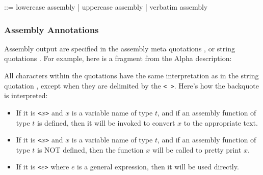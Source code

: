 \begin{SML}
    ::=
      lowercase assembly
    | uppercase assembly
    | verbatim  assembly
\end{SML}

\subsubsection{Assembly Annotations}

   Assembly output are specified in the assembly meta quotations
, or string quotations .   
For example, here is a fragment from the Alpha description:


   All characters within the quotations  have the same 
interpretation as in the string quotation , except when
they are delimited by the 
\verb|< >|.
Here's how the backquote is interpreted:
\begin{itemize}
\item If it is \verb|<|$x$\verb.>. and $x$ is a variable name of type $t$,
  and if an assembly function of type $t$ is defined, then it will be invoked
  to convert $x$ to the appropriate text.
\item If it is \verb|<|$x$\verb.>. and $x$ is a variable name of type $t$,
  and if an assembly function of type $t$ is NOT defined, 
  then the function $x$ will be called to pretty print $x$.
 \item If it is \verb|<|$e$\verb.>. where $e$ is a general expression, then
  it will be used directly. 
\end{itemize}

